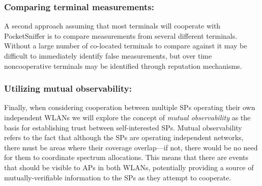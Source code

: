 \subsubsection{Comparing terminal measurements:\space} A second approach
assuming that most terminals will cooperate with PocketSniffer is to compare
measurements from several different terminals. Without a large number of
co-located terminals to compare against it may be difficult to immediately
identify false measurements, but over time noncooperative terminals may be
identified through reputation mechanisms.

\subsubsection{Utilizing mutual observability:\space} Finally, when
considering cooperation between multiple SPs operating their own independent
WLANs we will explore the concept of \textit{mutual observability} as the
basis for establishing trust between self-interested SPs. Mutual
observability refers to the fact that although the SPs are operating
independent networks, there must be areas where their coverage overlap---if
not, there would be no need for them to coordinate spectrum allocations. This
means that there are events that should be visible to APs in both WLANs,
potentially providing a source of mutually-verifiable information to the SPs
as they attempt to cooperate.
